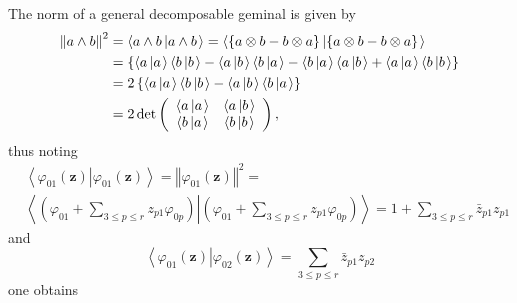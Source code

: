 \documentclass[aps,preprint]{revtex4}%
\begin{document}
The norm of a general decomposable geminal is given by
\begin{align}
\left\Vert a\wedge b\right\Vert ^{2} &  =\left\langle a\wedge b\left\vert
a\wedge b\right.  \right\rangle =\left\langle \left\{  a\otimes b-b\otimes
a\right\}  \left\vert \left\{  a\otimes b-b\otimes a\right\}  \right.
\right\rangle \nonumber\\
&  =\left\{  \left\langle a\left\vert a\right.  \right\rangle \left\langle
b\left\vert b\right.  \right\rangle -\left\langle a\left\vert b\right.
\right\rangle \left\langle b\left\vert a\right.  \right\rangle -\left\langle
b\left\vert a\right.  \right\rangle \left\langle a\left\vert b\right.
\right\rangle +\left\langle a\left\vert a\right.  \right\rangle \left\langle
b\left\vert b\right.  \right\rangle \right\}  \nonumber\\
&  =2\left\{  \left\langle a\left\vert a\right.  \right\rangle \left\langle
b\left\vert b\right.  \right\rangle -\left\langle a\left\vert b\right.
\right\rangle \left\langle b\left\vert a\right.  \right\rangle \right\}
\nonumber\\
&  =2\det\left(
\begin{array}
[c]{cc}%
\left\langle a\left\vert a\right.  \right\rangle  & \left\langle a\left\vert
b\right.  \right\rangle \\
\left\langle b\left\vert a\right.  \right\rangle  & \left\langle b\left\vert
b\right.  \right\rangle
\end{array}
\right)  ,
\end{align}
thus noting
\begin{align}
&  \left\langle \varphi_{01}\left(  \mathbf{z}\right)  \left\vert \varphi
_{01}\left(  \mathbf{z}\right)  \right.  \right\rangle =\left\Vert
\varphi_{01}\left(  \mathbf{z}\right)  \right\Vert ^{2}=\nonumber\\
&  \left\langle \left(  \varphi_{01}+\sum\limits_{3\leq p\leq r}z_{p1}%
\varphi_{0p}\right)  \left\vert \left(  \varphi_{01}+\sum\limits_{3\leq p\leq
r}z_{p1}\varphi_{0p}\right)  \right.  \right\rangle =1+\sum\limits_{3\leq
p\leq r}\bar{z}_{p1}z_{p1}\nonumber
\end{align}
and
\begin{equation}
\left\langle \varphi_{01}\left(  \mathbf{z}\right)  \left\vert \varphi
_{02}\left(  \mathbf{z}\right)  \right.  \right\rangle =\sum\limits_{3\leq
p\leq r}\bar{z}_{p1}z_{p2}%
\end{equation}
one obtains
\end{document}
